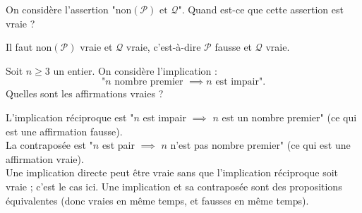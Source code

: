 \begin{question}
On considère l'assertion "$\text{non}(\mathcal{P}) \text{ et } \mathcal{Q}$".
Quand est-ce que cette assertion est vraie ?
\begin{answers} 
\end{answers}
\begin{explanations}
Il faut  $\text{non}(\mathcal{P})$ vraie et $\mathcal{Q}$ vraie, c'est-à-dire
$\mathcal{P}$ fausse et $\mathcal{Q}$ vraie.
\end{explanations}
\end{question}


\begin{question}
Soit $n \ge 3$ un entier.
On considère l'implication :
$$\text{"}n \text{ nombre premier } \implies  n \text{ est impair".}$$
Quelles sont les affirmations vraies ?
\begin{answers}
\end{answers}
\begin{explanations}
L'implication réciproque est "$n$ est impair $\implies$ $n$ est un nombre premier" (ce qui est une affirmation fausse). \\
La contraposée est "$n$ est pair $\implies$  $n$ n'est pas nombre premier" (ce qui est une affirmation vraie). \\
Une implication directe peut être vraie sans que l'implication réciproque soit vraie ; c'est le cas ici.
Une implication et sa contraposée sont des propositions équivalentes (donc vraies en même temps, et fausses en même temps). \\
\end{explanations}
\end{question}


